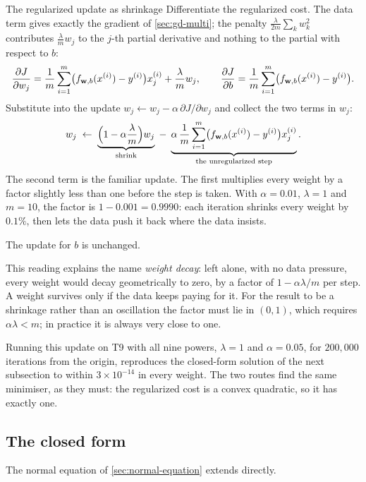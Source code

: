 \begin{derivation}{The regularized update as shrinkage}
Differentiate the regularized cost. The data term gives exactly the gradient of
\cref{sec:gd-multi}; the penalty $\frac{\lambda}{2m}\sum_k w_k^2$ contributes
$\frac{\lambda}{m}w_j$ to the $j$-th partial derivative and nothing to the
partial with respect to $b$:
\[
  \frac{\partial J}{\partial w_j}
    = \frac1m\sum_{i=1}^{m}\bigl(f_{\mathbf{w},b}(x^{(i)})-y^{(i)}\bigr)x^{(i)}_{j}
      + \frac{\lambda}{m}w_j ,
  \qquad
  \frac{\partial J}{\partial b}
    = \frac1m\sum_{i=1}^{m}\bigl(f_{\mathbf{w},b}(x^{(i)})-y^{(i)}\bigr).
\]
Substitute into the update $w_j \leftarrow w_j - \alpha\,\partial J/\partial w_j$
and collect the two terms in $w_j$:
\[
  w_j \;\leftarrow\;
  \underbrace{\Bigl(1 - \alpha\frac{\lambda}{m}\Bigr) w_j}_{\text{shrink}}
  \;-\;
  \underbrace{\alpha\,\frac1m\sum_{i=1}^{m}\bigl(f_{\mathbf{w},b}(x^{(i)})-y^{(i)}\bigr)x^{(i)}_{j}}_{\text{the unregularized step}} .
\]
The second term is the familiar update. The first multiplies every weight by a
factor slightly less than one before the step is taken. With $\alpha = 0.01$,
$\lambda = 1$ and $m = 10$, the factor is $1 - 0.001 = 0.9990$: each iteration
shrinks every weight by $0.1\%$, then lets the data push it back where the data
insists.

The update for $b$ is unchanged.
\end{derivation}

This reading explains the name \emph{weight decay}: left alone, with no data
pressure, every weight would decay geometrically to zero, by a factor of
$1-\alpha\lambda/m$ per step. A weight survives only if the data keeps paying
for it. For the result to be a shrinkage rather than an oscillation the factor
must lie in $(0,1)$, which requires $\alpha\lambda < m$; in practice it is
always very close to one.

Running this update on T9 with all nine powers, $\lambda = 1$ and
$\alpha = 0.05$, for $200{,}000$ iterations from the origin, reproduces the
closed-form solution of the next subsection to within $3\times10^{-14}$ in every
weight. The two routes find the same minimiser, as they must: the regularized
cost is a convex quadratic, so it has exactly one.

\subsection{The closed form}

The normal equation of \cref{sec:normal-equation} extends directly.

